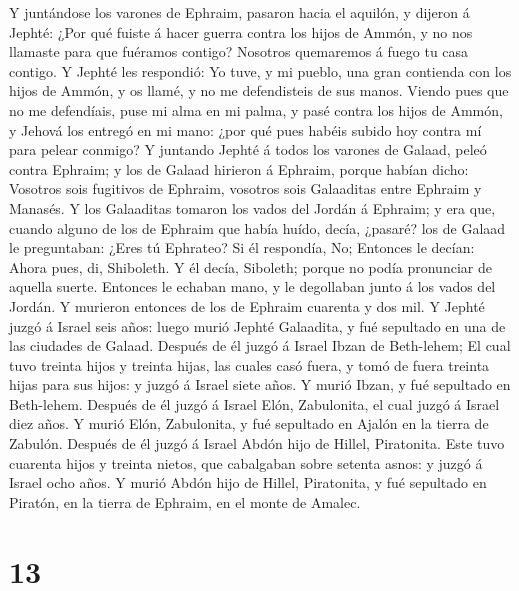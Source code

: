  Y juntándose los varones de Ephraim, pasaron hacia el
aquilón, y dijeron á Jephté: ¿Por qué fuiste á hacer guerra contra los
hijos de Ammón, y no nos llamaste para que fuéramos contigo? Nosotros
quemaremos á fuego tu casa contigo.  Y Jephté les
respondió: Yo tuve, y mi pueblo, una gran contienda con los hijos de
Ammón, y os llamé, y no me defendisteis de sus manos. 
Viendo pues que no me defendíais, puse mi alma en mi palma, y pasé
contra los hijos de Ammón, y Jehová los entregó en mi mano: ¿por qué
pues habéis subido hoy contra mí para pelear conmigo?  Y
juntando Jephté á todos los varones de Galaad, peleó contra Ephraim; y
los de Galaad hirieron á Ephraim, porque habían dicho: Vosotros sois
fugitivos de Ephraim, vosotros sois Galaaditas entre Ephraim y Manasés.
 Y los Galaaditas tomaron los vados del Jordán á Ephraim;
y era que, cuando alguno de los de Ephraim que había huído, decía,
¿pasaré? los de Galaad le preguntaban: ¿Eres tú Ephrateo? Si él
respondía, No;  Entonces le decían: Ahora pues, di,
Shiboleth. Y él decía, Siboleth; porque no podía pronunciar de aquella
suerte. Entonces le echaban mano, y le degollaban junto á los vados del
Jordán. Y murieron entonces de los de Ephraim cuarenta y dos mil.
 Y Jephté juzgó á Israel seis años: luego murió Jephté
Galaadita, y fué sepultado en una de las ciudades de Galaad.
 Después de él juzgó á Israel Ibzan de Beth-lehem;
 El cual tuvo treinta hijos y treinta hijas, las cuales
casó fuera, y tomó de fuera treinta hijas para sus hijos: y juzgó á
Israel siete años.  Y murió Ibzan, y fué sepultado en
Beth-lehem.  Después de él juzgó á Israel Elón,
Zabulonita, el cual juzgó á Israel diez años.  Y murió
Elón, Zabulonita, y fué sepultado en Ajalón en la tierra de Zabulón.
 Después de él juzgó á Israel Abdón hijo de Hillel,
Piratonita.  Este tuvo cuarenta hijos y treinta nietos,
que cabalgaban sobre setenta asnos: y juzgó á Israel ocho años.
 Y murió Abdón hijo de Hillel, Piratonita, y fué
sepultado en Piratón, en la tierra de Ephraim, en el monte de Amalec.

\hypertarget{section-12}{%
\section{13}\label{section-12}}

